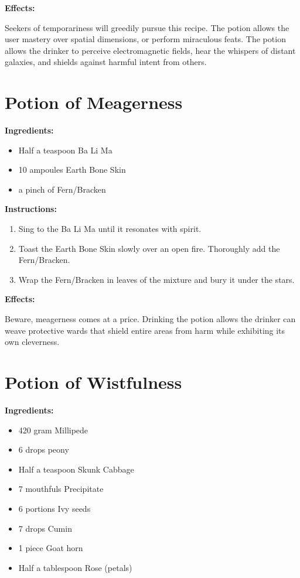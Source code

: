 \documentclass{article}
\begin{document}
\textbf{Effects:}

Seekers of temporariness will greedily pursue this recipe. The potion allows the user mastery over spatial dimensions, or perform miraculous feats. The potion allows the drinker to perceive electromagnetic fields, hear the whispers of distant galaxies, and shields against harmful intent from others.

\newpage
\section*{Potion of Meagerness}

\textbf{Ingredients:}

\begin{itemize}
  \item Half a teaspoon Ba Li Ma
  \item 10 ampoules Earth Bone Skin
  \item a pinch of Fern/Bracken
\end{itemize}

\textbf{Instructions:}

\begin{enumerate}
  \item Sing to the Ba Li Ma until it resonates with spirit.
  \item Toast the Earth Bone Skin slowly over an open fire. Thoroughly add the Fern/Bracken.
  \item Wrap the Fern/Bracken in leaves of the mixture and bury it under the stars.
\end{enumerate}

\textbf{Effects:}

Beware, meagerness comes at a price. Drinking the potion allows the drinker can weave protective wards that shield entire areas from harm while exhibiting its own cleverness.

\newpage
\section*{Potion of Wistfulness}

\textbf{Ingredients:}

\begin{itemize}
  \item 420 gram Millipede
  \item 6 drops peony
  \item Half a teaspoon Skunk Cabbage
  \item 7 mouthfuls Precipitate
  \item 6 portions Ivy seeds
  \item 7 drops Cumin
  \item 1 piece Goat horn
  \item Half a tablespoon Rose (petals)
\end{itemize}
\end{document}
